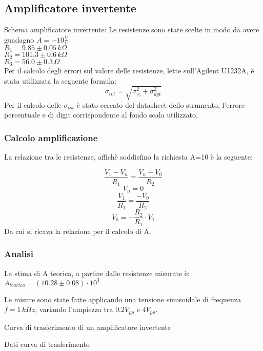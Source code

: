 \subsection{Amplificatore invertente}
Schema amplificatore invertente:
Le resistenze sono state scelte in modo da avere guadagno $A=-10 \frac{V}{V}$\\
$R_1=9.85 \pm 0.05\,k\Omega $\\ %
$R_2=101.3 \pm 0.6\,k\Omega$\\ %
$R_3=56.0 \pm 0.3\,\Omega$\\ %

Per il calcolo degli errori sul valore delle resistenze, lette sull'Agilent U1232A, è stata utilizzata la seguente formula:
$$\sigma_{tot}=\sqrt{ \sigma^{2} _{\%} + \sigma^{2} _{dgt}}$$
Per il calcolo delle $\sigma_{tot}$ è stato cercato del datasheet dello strumento, l'errore percentuale e di digit
corrispondente al fondo scala utilizzato.

\subsubsection{Calcolo amplificazione}
La relazione tra le resistenze, affichè soddisfino la richiesta A=10 è la seguente:

$$\frac{V_1-V_n}{R_1}=\frac{V_n-V_0}{R_2}$$
$$V_n=0$$
$$\frac{V_1}{R_1}=\frac{-V_0}{R_2}$$
$$V_0=-\frac{R_2}{R_1} \cdot V_1$$
Da cui si ricava la relazione per il calcolo di A.

\subsubsection{Analisi}
La stima di A teorica, a partire dalle resistenze misurate è:
$A_{teorica}=(10.28 \pm 0.08)\cdot10^3$ %

Le misure sono state fatte applicando una tensione sinusoidale di frequenza $ f=1 \,kHz$, variando l'ampiezza tra 
$0.2 V_{pp}$ e $4 V_{pp}$.

\begin{grafico} 
 \centering 
  
 \caption{Curva di trasferimento di un amplificatore invertente} 
 \label{gr:amp_inv.tex} 
\end{grafico}

\begin{tabella}
 \centering
  
 \caption{Dati curva di trasferimento}
 \label{tab:tab_inv.tex}
\end{tabella}

